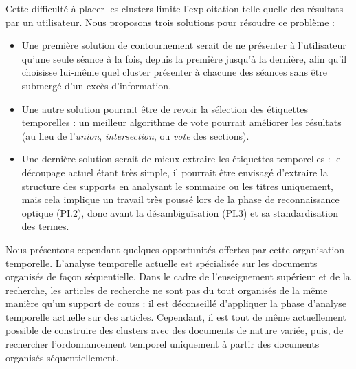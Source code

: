 Cette difficulté à placer les clusters limite l'exploitation telle quelle des résultats par un utilisateur.
Nous proposons trois solutions pour résoudre ce problème :
\begin{itemize}
\item Une première solution de contournement serait de ne présenter à l'utilisateur qu'une seule séance à la fois, depuis la première jusqu'à la dernière, afin qu'il choisisse lui-même quel cluster présenter à chacune des séances sans être submergé d'un excès d'information.
\item Une autre solution pourrait être de revoir la sélection des étiquettes temporelles : un meilleur algorithme de vote pourrait améliorer les résultats (au lieu de l'\textit{union}, \textit{intersection}, ou \textit{vote} des sections).
\item Une dernière solution serait de mieux extraire les étiquettes temporelles : le découpage actuel étant très simple, il pourrait être envisagé d'extraire la structure des supports en analysant le sommaire ou les titres uniquement, mais cela implique un travail très poussé lors de la phase de reconnaissance optique (PI.2), donc avant la désambiguïsation (PI.3) et sa standardisation des termes.
\end{itemize}

\bigskip

Nous présentons cependant quelques opportunités offertes par cette organisation temporelle.
L'analyse temporelle actuelle est spécialisée sur les documents organisés de façon séquentielle.
Dans le cadre de l'enseignement supérieur et de la recherche, les articles de recherche ne sont pas du tout organisés de la même manière qu'un support de cours : il est déconseillé d'appliquer la phase d'analyse temporelle actuelle sur des articles.
Cependant, il est tout de même actuellement possible de construire des clusters avec des documents de nature variée, puis, de rechercher l'ordonnancement temporel uniquement à partir des documents organisés séquentiellement.

\bigskip

